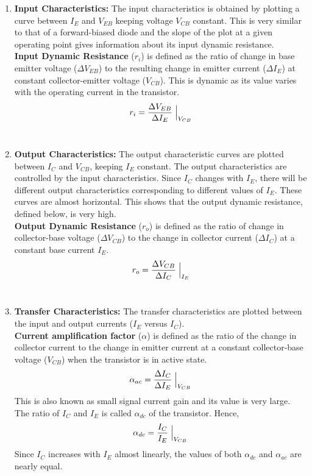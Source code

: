 \begin{enumerate}
\item \textbf{Input Characteristics:}
    The input characteristics is obtained by plotting a curve between $I_E$ and $V_{EB}$ keeping voltage $V_{CB}$ constant. This is very similar to that of a forward-biased diode and the slope of the plot at a given operating point gives information about its input dynamic resistance.\\

    \textbf{Input Dynamic Resistance} ($r_i$) is defined as the ratio of change in base emitter voltage ($\Delta V_{EB}$) to the resulting change in emitter current ($\Delta I_E$) at constant collector-emitter voltage ($V_{CB}$). This is dynamic as its value varies with the operating current in the transistor.
    \begin{align}
        r_i = \frac{\Delta V_{EB}}{\Delta I_E}\Bigm|_{V_{CB}}
    \end{align}\\

\item \textbf{Output Characteristics:}
    The output characteristic curves are plotted between $I_C$ and $V_{CB}$, keeping $I_E$ constant. The output characteristics are controlled by the input characteristics. Since $I_C$ changes with $I_E$, there will be different output characteristics corresponding to different values of $I_E$. These curves are almost horizontal. This shows that the output dynamic resistance, defined below, is very high.\\

    \textbf{Output Dynamic Resistance} ($r_o$) is defined as the ratio of change in collector-base voltage ($\Delta V_{CB}$) to the change in collector current ($\Delta I_C$) at a constant base current $I_E$.
    \begin{align}
        r_o = \frac{\Delta V_{CB}}{\Delta I_C}\Bigm|_{I_E}
    \end{align}\\

\item \textbf{Transfer Characteristics:}
    The transfer characteristics are plotted between the input and output currents ($I_E$ versus $I_C$).\\

    \textbf{Current amplification factor} ($\alpha$) is defined as the ratio of the change in collector current to the change in emitter current at a constant collector-base voltage ($V_{CB}$) when the transistor is in active state.
    \begin{align}
        \alpha_{ac} = \frac{\Delta I_C}{\Delta I_E}\Bigm|_{V_{CB}}
    \end{align}
    This is also known as small signal current gain and its value is very large. The ratio of $I_C$ and $I_E$ is called $\alpha_{dc}$ of the transistor. Hence,
    \begin{align}
        \alpha_{dc} = \frac{I_C}{I_E}\Bigm|_{V_{CB}}
    \end{align}
    Since $I_C$ increases with $I_E$ almost linearly, the values of both $\alpha_{dc}$ and $\alpha_{ac}$ are nearly equal.

\end{enumerate}

